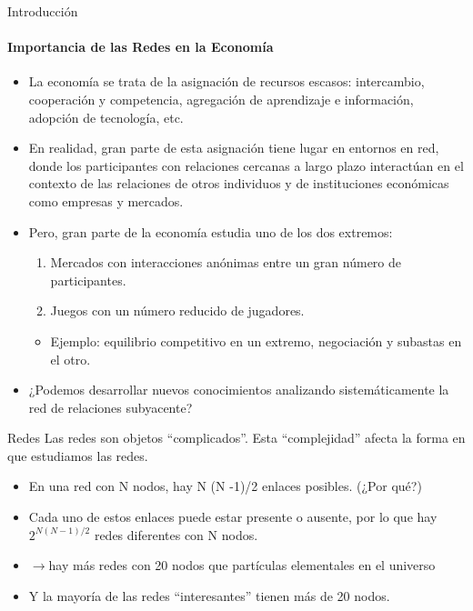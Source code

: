 \documentclass[11pt]{beamer}
\begin{document}
\begin{frame}{Introducción}
\framesubtitle{Importancia de las Redes en la Economía}
\begin{itemize}
\small    \item La economía se trata de la asignación de recursos escasos: intercambio, cooperación y competencia, agregación de aprendizaje e información, adopción de tecnología, etc.
\item En realidad, gran parte de esta asignación tiene lugar en entornos en red, donde los participantes con relaciones cercanas a largo plazo interactúan en el contexto de las relaciones de otros individuos y de instituciones económicas como empresas y mercados.
\item Pero, gran parte de la economía estudia uno de los dos extremos:
\begin{enumerate}
    \item Mercados con interacciones anónimas entre un gran número de participantes.
\item  Juegos con un número reducido de jugadores.
\end{enumerate}
\begin{itemize}
    \item Ejemplo: equilibrio competitivo en un extremo, negociación y subastas en el otro.
\end{itemize}
\item ¿Podemos desarrollar nuevos conocimientos analizando sistemáticamente la red de relaciones subyacente?
    \end{itemize}
\end{frame}

\begin{frame}{Redes}
Las redes son objetos ``complicados''. Esta ``complejidad'' afecta la forma en que estudiamos las redes.
\begin{itemize}
    \item   En una red con N nodos, hay N (N -1)/2 enlaces posibles. (¿Por qué?)
\item  Cada uno de estos enlaces puede estar presente o ausente, por lo que hay $2^{N (N -1 )/2}$ redes diferentes con N nodos.
\item $\longrightarrow$hay más redes con 20 nodos que partículas elementales en el universo
\item Y la mayoría de las redes ``interesantes'' tienen más de 20 nodos. 
\end{itemize}
\end{frame}
\end{document}
